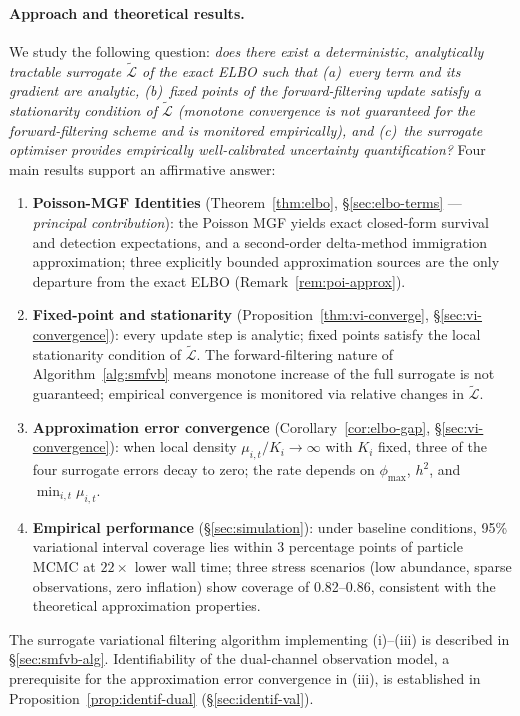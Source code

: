\documentclass[review,12pt]{elsarticle}
\theoremstyle{definition}
\begin{document}
\paragraph{Approach and theoretical results.}
We study the following question: \emph{does there exist a deterministic,
analytically tractable surrogate $\tilde{\mathcal{L}}$ of the exact ELBO
such that (a)~every term and its gradient are analytic,
(b)~fixed points of the forward-filtering update satisfy a stationarity condition
of $\tilde{\mathcal{L}}$ (monotone convergence is not guaranteed for the
forward-filtering scheme and is monitored empirically), and
(c)~the surrogate optimiser provides empirically well-calibrated
uncertainty quantification?}
Four main results support an affirmative answer:
\begin{enumerate}[label=(\roman*)]
\item \textbf{Poisson-MGF Identities} (Theorem~\ref{thm:elbo},
  \S\ref{sec:elbo-terms} --- \emph{principal contribution}): the Poisson MGF
  yields exact closed-form survival and detection expectations, and a
  second-order delta-method immigration approximation; three explicitly
  bounded approximation sources are the only departure from the exact ELBO
  (Remark~\ref{rem:poi-approx}).
\item \textbf{Fixed-point and stationarity} (Proposition~\ref{thm:vi-converge},
  \S\ref{sec:vi-convergence}): every update step is analytic; fixed points
  satisfy the local stationarity condition of $\tilde{\mathcal{L}}$.
  The forward-filtering nature of Algorithm~\ref{alg:smfvb} means monotone
  increase of the full surrogate is not guaranteed; empirical convergence is
  monitored via relative changes in $\tilde{\mathcal{L}}$.
\item \textbf{Approximation error convergence} (Corollary~\ref{cor:elbo-gap},
  \S\ref{sec:vi-convergence}): when local density $\mu_{i,t}/K_i\to\infty$
  with $K_i$ fixed, three of the four surrogate errors decay to zero; the rate depends
  on $\phi_{\max}$, $h^2$, and $\min_{i,t}\mu_{i,t}$.
\item \textbf{Empirical performance} (\S\ref{sec:simulation}): under baseline
  conditions, 95\% variational interval coverage lies within 3 percentage
  points of particle MCMC at $22\times$ lower wall time; three stress scenarios
  (low abundance, sparse observations, zero inflation) show coverage of 0.82--0.86,
  consistent with the theoretical approximation properties.
\end{enumerate}
The surrogate variational filtering algorithm implementing (i)--(iii) is described in
\S\ref{sec:smfvb-alg}.
Identifiability of the dual-channel observation model, a prerequisite for
the approximation error convergence in (iii), is established in
Proposition~\ref{prop:identif-dual} (\S\ref{sec:identif-val}).
\end{document}
